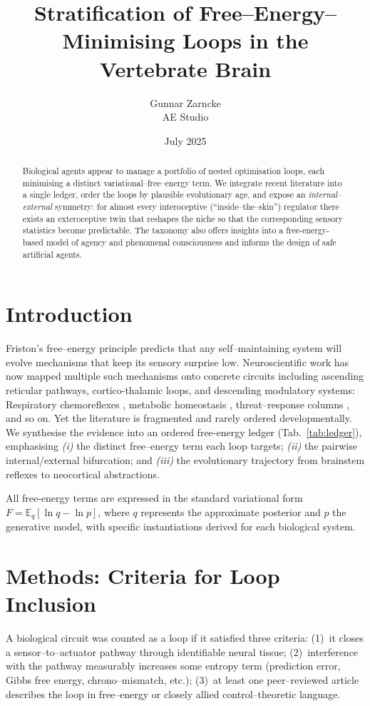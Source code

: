 \documentclass[10pt]{article}
\title{Stratification of Free--Energy--Minimising Loops in the Vertebrate Brain}
\author{Gunnar Zarncke\\
AE Studio}
\date{July 2025}
\begin{document}
\maketitle

\begin{abstract}
Biological agents appear to manage a portfolio of nested optimisation loops, each minimising a distinct variational--free--energy term.  
We integrate recent literature into a single ledger, order the loops by plausible evolutionary age, and expose an \emph{internal--external} symmetry: 
for almost every interoceptive (``inside--the--skin'') regulator there exists an exteroceptive twin 
that reshapes the niche so that the corresponding sensory statistics become predictable.  
The taxonomy also offers insights into a free-energy-based model of agency and phenomenal consciousness and informs the design of safe artificial agents.
\end{abstract}

\section{Introduction}
Friston's free--energy principle \cite{friston2010free} predicts that any self--maintaining system will evolve mechanisms that keep its sensory surprise low.  
Neuroscientific work has now mapped multiple such mechanisms onto concrete circuits including ascending reticular pathways, cortico-thalamic loops, and descending modulatory systems: 
Respiratory chemoreflexes \cite{guyenet2015co2}, 
metabolic homeostasis \cite{karraza2024metabolic}, 
threat--response columns \cite{zhang2023pag}, and so on.  
Yet the literature is fragmented and rarely ordered developmentally.  
We synthesise the evidence into an ordered free-energy ledger (Tab.~\ref{tab:ledger}), emphasising 
\emph{(i)} the distinct free--energy term each loop targets; 
\emph{(ii)} the pairwise internal/external bifurcation; and 
\emph{(iii)} the evolutionary trajectory from brainstem reflexes to neocortical abstractions.

All free-energy terms are expressed in the standard variational form $F = \mathbb{E}_q[\ln q - \ln p]$, where $q$ represents the approximate posterior and $p$ the generative model, with specific instantiations derived for each biological system.

\section{Methods: Criteria for Loop Inclusion}
A biological circuit was counted as a loop if it satisfied three criteria: 
(1)\ it closes a sensor--to--actuator pathway through identifiable neural tissue; 
(2)\ interference with the pathway measurably increases some entropy term (prediction error, Gibbs free energy, chrono--mismatch, etc.); 
(3)\ at least one peer--reviewed article describes the loop in free--energy or closely allied control--theoretic language.
\end{document}
